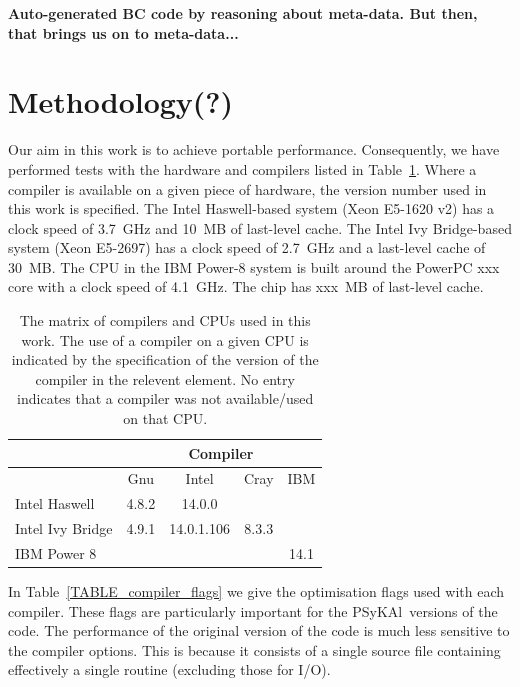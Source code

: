 \documentclass[journal]{IEEEtran}
\newcommand{\psykal}{{PS}y{KA}l\ }
\begin{document}
{\bf Auto-generated BC code by reasoning about meta-data. But then,
  that brings us on to meta-data...}

\section{Methodology(?)}

Our aim in this work is to achieve portable performance. Consequently,
we have performed tests with the hardware and compilers listed in
Table~\ref{TABLE_compilers}. Where a compiler is available on a given
piece of hardware, the version number used in this work is specified.
The Intel Haswell-based system (Xeon E5-1620 v2) has a clock speed of
3.7~GHz and 10~MB of last-level cache. The Intel Ivy Bridge-based
system (Xeon E5-2697) has a clock speed of 2.7~GHz and a last-level
cache of 30~MB. The CPU in the IBM Power-8 system is built around the
PowerPC xxx core with a clock speed of 4.1~GHz. The chip has xxx~MB of
last-level cache.

%
\begin{table}[!t]
\renewcommand{\arraystretch}{1.3}
\caption{The matrix of compilers and CPUs used in this work. The use
  of a compiler on a given CPU is indicated by the specification of
  the version of the compiler in the relevent element. No entry
  indicates that a compiler was not available/used on that CPU.}
\label{TABLE_compilers}
\centering
\begin{tabular}{|l|c|c|c|c|}
\hline
                 & \multicolumn{4}{c|}{Compiler}             \\
\hline
                 & Gnu   & Intel       & Cray    & IBM     \\
\hline
Intel Haswell    & 4.8.2 & 14.0.0      &         &          \\
Intel Ivy Bridge & 4.9.1 & 14.0.1.106  & 8.3.3   &          \\
IBM Power 8      &       &             &         & 14.1     \\
\hline
\end{tabular}
\end{table}

In Table~\ref{TABLE_compiler_flags} we give the optimisation flags
used with each compiler. These flags are particularly important for
the \psykal versions of the code. The performance of the original
version of the code is much less sensitive to the compiler
options. This is because it consists of a single source file
containing effectively a single routine (excluding those for I/O).
 
\end{document}
